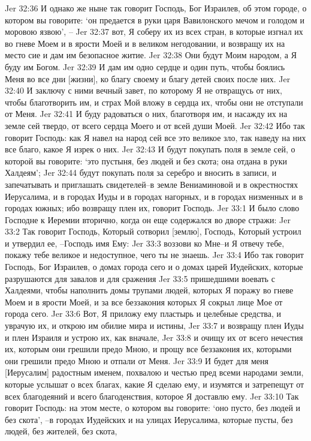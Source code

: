 Jer 32:36  И однако же ныне так говорит Господь, Бог Израилев, об этом городе, о котором вы говорите: `он предается в руки царя Вавилонского мечом и голодом и моровою язвою', --
Jer 32:37  вот, Я соберу их из всех стран, в которые изгнал их во гневе Моем и в ярости Моей и в великом негодовании, и возвращу их на место сие и дам им безопасное житие.
Jer 32:38  Они будут Моим народом, а Я буду им Богом.
Jer 32:39  И дам им одно сердце и один путь, чтобы боялись Меня во все дни [жизни], ко благу своему и благу детей своих после них.
Jer 32:40  И заключу с ними вечный завет, по которому Я не отвращусь от них, чтобы благотворить им, и страх Мой вложу в сердца их, чтобы они не отступали от Меня.
Jer 32:41  И буду радоваться о них, благотворя им, и насажду их на земле сей твердо, от всего сердца Моего и от всей души Моей.
Jer 32:42  Ибо так говорит Господь: как Я навел на народ сей все это великое зло, так наведу на них все благо, какое Я изрек о них.
Jer 32:43  И будут покупать поля в земле сей, о которой вы говорите: `это пустыня, без людей и без скота; она отдана в руки Халдеям';
Jer 32:44  будут покупать поля за серебро и вносить в записи, и запечатывать и приглашать свидетелей--в земле Вениаминовой и в окрестностях Иерусалима, и в городах Иуды и в городах нагорных, и в городах низменных и в городах южных; ибо возвращу плен их, говорит Господь.
Jer 33:1  И было слово Господне к Иеремии вторично, когда он еще содержался во дворе стражи:
Jer 33:2  Так говорит Господь, Который сотворил [землю], Господь, Который устроил и утвердил ее, --Господь имя Ему:
Jer 33:3  воззови ко Мне--и Я отвечу тебе, покажу тебе великое и недоступное, чего ты не знаешь.
Jer 33:4  Ибо так говорит Господь, Бог Израилев, о домах города сего и о домах царей Иудейских, которые разрушаются для завалов и для сражения
Jer 33:5  пришедшими воевать с Халдеями, чтобы наполнить домы трупами людей, которых Я поражу во гневе Моем и в ярости Моей, и за все беззакония которых Я сокрыл лице Мое от города сего.
Jer 33:6  Вот, Я приложу ему пластырь и целебные средства, и уврачую их, и открою им обилие мира и истины,
Jer 33:7  и возвращу плен Иуды и плен Израиля и устрою их, как вначале,
Jer 33:8  и очищу их от всего нечестия их, которым они грешили предо Мною, и прощу все беззакония их, которыми они грешили предо Мною и отпали от Меня.
Jer 33:9  И будет для меня [Иерусалим] радостным именем, похвалою и честью пред всеми народами земли, которые услышат о всех благах, какие Я сделаю ему, и изумятся и затрепещут от всех благодеяний и всего благоденствия, которое Я доставлю ему.
Jer 33:10  Так говорит Господь: на этом месте, о котором вы говорите: `оно пусто, без людей и без скота', --в городах Иудейских и на улицах Иерусалима, которые пусты, без людей, без жителей, без скота,
